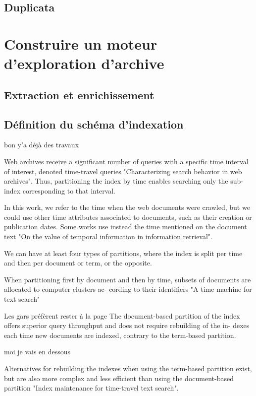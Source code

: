 \documentclass[symmetric,justified,marginals=raggedouter]{tufte-book}
\begin{document}
\subsection{Duplicata}

\section{Construire un moteur d'exploration d'archive}
\label{sec:4_moteur}

\subsection{Extraction et enrichissement}

\subsection{Définition du schéma d'indexation}

bon y'a déjà des travaux 

Web archives receive a significant number of queries with a
specific time interval of interest, denoted time-travel queries
"Characterizing search
behavior in web archives".  Thus, partitioning the index by time enables searching
only the sub-index corresponding to that interval.

In this
work,  we  refer  to  the  time  when  the  web  documents  were
crawled, but we could use other time attributes associated
to  documents,  such  as  their  creation  or  publication  dates.
Some works use instead the time mentioned on the document
text "On the
value of temporal information in information retrieval".

We can have at least four types of partitions, where the
index is split per time and then per document or term, or the
opposite.

When  partitioning  first  by  document  and  then  by  time,
subsets of documents are allocated to computer clusters ac-
cording to their identifiers "A time machine for text search"

Les gars préfèrent rester à la page 
The document-based partition of the index offers superior
query throughput and does not require rebuilding of the in-
dexes  each  time  new  documents  are  indexed,  contrary  to
the term-based partition. 

moi je vais en dessous 

Alternatives  for  rebuilding  the  indexes
when using the term-based partition exist, but are also more
complex  and  less  efficient  than  using  the  document-based
partition "Index maintenance for time-travel text
search".
\end{document}
